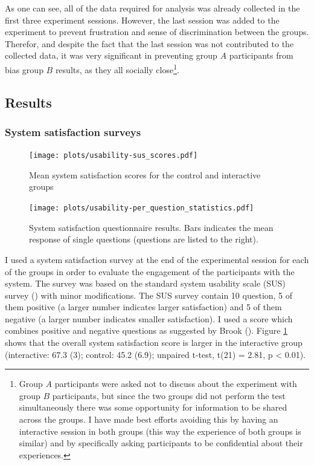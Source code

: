 \documentclass[a4paper,11pt]{article}
\begin{document}
{As one can see, all of the data required for analysis was already collected in the first three experiment sessions.
However, the last session was added to the experiment to prevent frustration and sense of discrimination between the groups.
Therefor, and despite the fact that the last session was not contributed to the collected data, it was very significant in preventing group $A$ participants from bias group $B$ results, as they all socially close\footnote{Group $A$ participants were asked not to discuss about the experiment with group $B$ participants, but since the two groups did not perform the test simultaneously there was some opportunity for information to be shared across the groups. I have made best efforts avoiding this by having an interactive session in both groups (this way the experience of both groups is similar) and by specifically asking participants to be confidential about their experiences.}.

\subsection{Results}

\subsubsection{System satisfaction surveys}

\begin{figure}[!htb]
    \centering
    \texttt{[image: plots/usability-sus\_scores.pdf]}
    \caption{Mean system satisfaction scores for the control and interactive groups}\label{plot:usability-sus_scores}
\end{figure}

\begin{figure}[!htb]
    \centering
    \texttt{[image: plots/usability-per\_question\_statistics.pdf]}
    \caption{System satisfaction questionnaire results. Bars indicates the mean response of single questions (questions are listed to the right).}\label{plot:usability-per_question_statistics}
\end{figure}

I used a system satisfaction survey at the end of the experimental session for each of the groups in order to evaluate the engagement of the participants with the system.
The survey was based on the standard system usability scale (SUS) survey (\cite{brooke96}) with minor modifications.
The SUS survey contain 10 question, 5 of them positive (a larger number indicates larger satisfaction) and 5 of them negative (a larger number indicates smaller satisfaction).
I used a score which combines positive and negative questions as suggested by Brook (\cite*{brooke96}).
Figure \ref{plot:usability-sus_scores} shows that the overall system satisfaction score is larger in the interactive group (interactive: 67.3 (3); control: 45.2 (6.9); unpaired t-test, t(21) = 2.81, p \textless{} 0.01).

}
\end{document}
